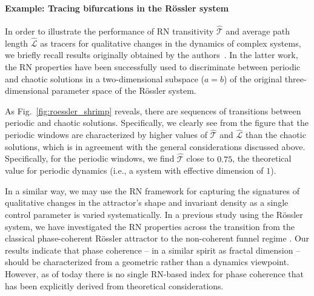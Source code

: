 

\paragraph{Example: Tracing bifurcations in the R\"ossler system}

In order to illustrate the performance of RN transitivity $\hat{\mathcal{T}}$ and average path length $\hat{\mathcal{L}}$ as tracers for qualitative changes in the dynamics of complex systems, we briefly recall results originally obtained by the authors~\cite{Zou2010}. In the latter work, the RN properties have been successfully used to discriminate between periodic and chaotic solutions in a two-dimensional subspace ($a=b$) of the original three-dimensional parameter space of the R\"ossler system.

As Fig.~\ref{fig:roessler_shrimp} reveals, there are sequences of transitions between periodic and chaotic solutions. Specifically, we clearly see from the figure that the periodic windows are characterized by higher values of $\hat{\mathcal{T}}$ and $\hat{\mathcal{L}}$ than the chaotic solutions, which is in agreement with the general considerations discussed above. Specifically, for the periodic windows, we find $\hat{\mathcal{T}}$ close to $0.75$, the theoretical value for periodic dynamics (i.e., a system with effective dimension of $1$).

In a similar way, we may use the RN framework for capturing the signatures of qualitative changes in the attractor's shape and invariant density as a single control parameter is varied systematically. In a previous study using the R\"ossler system, we have investigated the RN properties across the transition from the classical phase-coherent R\"ossler attractor to the non-coherent funnel regime \cite{Zou2012aChaos}. Our results indicate that phase coherence -- in a similar spirit as fractal dimension -- should be characterized from a geometric rather than a dynamics viewpoint. However, as of today there is no single RN-based index for phase coherence that has been explicitly derived from theoretical considerations.

